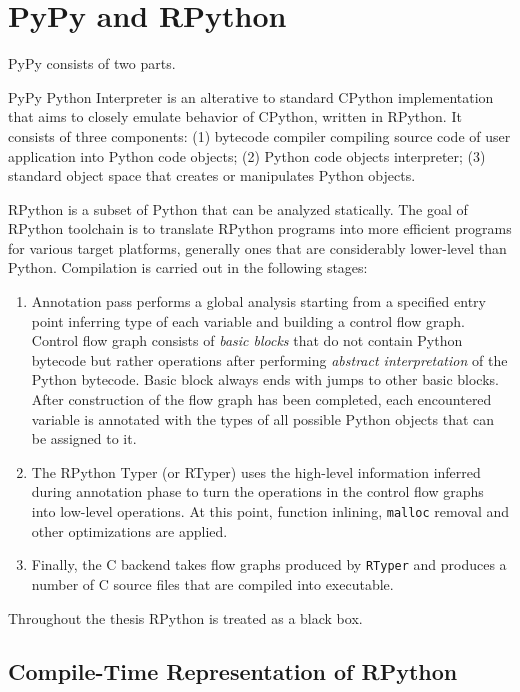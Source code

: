 \chapter{PyPy and RPython}
PyPy consists of two parts. 

PyPy Python Interpreter is an alterative to standard CPython implementation that aims to closely emulate behavior of CPython, written in RPython. It consists of three components: (1) bytecode compiler compiling source code of user application into Python code objects; (2) Python code objects interpreter; (3) standard object space that creates or manipulates Python objects.

RPython is a subset of Python that can be analyzed statically. The goal of RPython toolchain is to translate RPython programs into more efficient programs for various target platforms, generally ones that are considerably lower-level than Python. Compilation is carried out in the following stages:

\begin{enumerate}
\item Annotation pass performs a global analysis starting from a specified entry point inferring type of each variable and building a control flow graph. Control flow graph consists of \textit{basic blocks} that do not contain Python bytecode but rather operations after performing \textit{abstract interpretation} of the Python bytecode. Basic block always ends with jumps to other basic blocks. After construction of the flow graph has been completed, each encountered variable is annotated with the types of all possible Python objects that can be assigned to it.

\item 
The RPython Typer (or RTyper) uses the high-level information inferred during annotation phase to turn the operations in the control flow graphs into low-level operations. At this point, function inlining, \texttt{malloc} removal and other optimizations are applied. 

\item
Finally, the C backend takes flow graphs produced by \texttt{RTyper} and produces a number of C source files that are compiled into executable.
\end{enumerate}

Throughout the thesis RPython is treated as a black box. 

\section{Compile-Time Representation of RPython}

